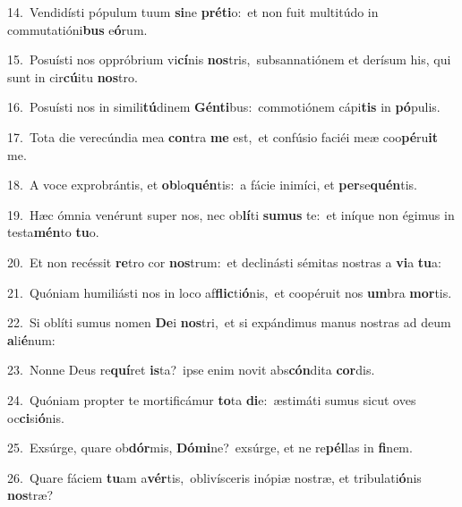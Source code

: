 {\numbfont\textcolor{\numbcolor}{14.}}~Vendidísti pópulum tuum \textbf{si}\-ne \textbf{pré}\-\textbf{ti}o:~\star et non fuit multitúdo in commutatióni\textbf{bus} e\-\textbf{ó}\-rum.\par
{\numbfont\textcolor{\numbcolor}{15.}}~Posuísti nos oppróbrium vi\-\textbf{cí}\-nis \textbf{nos}\-tris,~\star subsannatiónem et derísum his, qui sunt in cir\-\textbf{cú}\-itu \textbf{nos}\-tro.\par
{\numbfont\textcolor{\numbcolor}{16.}}~Posuísti nos in simili\-\textbf{tú}\-dinem \textbf{Gén}\-\textbf{ti}bus:~\star commotiónem cápi\textbf{tis} in \textbf{pó}\-pulis.\par
{\numbfont\textcolor{\numbcolor}{17.}}~Tota die verecúndia mea \textbf{con}\-tra \textbf{me} est,~\star et confúsio faciéi meæ coo\-\textbf{pé}\-ru\textbf{it} me.\par
{\numbfont\textcolor{\numbcolor}{18.}}~A voce exprobrántis, et \textbf{ob}\-lo\-\textbf{quén}\-tis:~\star a fácie inimíci, et \textbf{per}\-se\-\textbf{quén}\-tis.\par
{\numbfont\textcolor{\numbcolor}{19.}}~Hæc ómnia venérunt super nos, nec ob\-\textbf{lí}\-ti \textbf{su}\-\textbf{mus} te:~\star et iníque non égimus in testa\-\textbf{mén}\-to \textbf{tu}\-o.\par
{\numbfont\textcolor{\numbcolor}{20.}}~Et non recéssit \textbf{re}\-tro cor \textbf{nos}\-trum:~\star et declinásti sémitas nostras a \textbf{vi}\-a \textbf{tu}\-a:\par
{\numbfont\textcolor{\numbcolor}{21.}}~Quóniam humiliásti nos in loco af\-\textbf{flic}\-ti\-\textbf{ó}\-nis,~\star et coopéruit nos \textbf{um}\-bra \textbf{mor}\-tis.\par
{\numbfont\textcolor{\numbcolor}{22.}}~Si oblíti sumus nomen \textbf{De}\-i \textbf{nos}\-tri,~\star et si expándimus manus nostras ad deum \textbf{a}\-li\-\textbf{é}\-num:\par
{\numbfont\textcolor{\numbcolor}{23.}}~Nonne Deus re\-\textbf{quí}\-ret \textbf{is}\-ta?~\star ipse enim novit abs\-\textbf{cón}\-dita \textbf{cor}\-dis.\par
{\numbfont\textcolor{\numbcolor}{24.}}~Quóniam propter te mortificámur \textbf{to}\-ta \textbf{di}\-e:~\star æstimáti sumus sicut oves oc\-\textbf{ci}\-si\-\textbf{ó}\-nis.\par
{\numbfont\textcolor{\numbcolor}{25.}}~Exsúrge, quare ob\-\textbf{dór}\-mis, \textbf{Dó}\-\textbf{mi}ne?~\star exsúrge, et ne re\-\textbf{pél}\-las in \textbf{fi}\-nem.\par
{\numbfont\textcolor{\numbcolor}{26.}}~Quare fáciem \textbf{tu}\-am a\-\textbf{vér}\-tis,~\star oblivísceris inópiæ nostræ, et tribulati\-\textbf{ó}\-nis \textbf{nos}\-træ?\par
